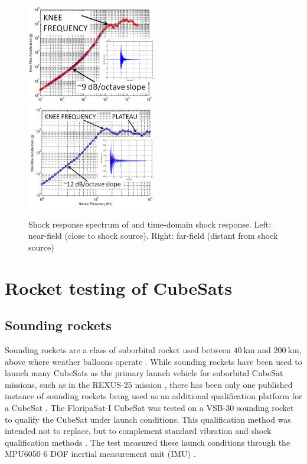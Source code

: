\documentclass{report}
\begin{document}
\begin{figure}[H]
  \includegraphics[width=0.5\textwidth]{images/pyroshock2.png}
  \includegraphics[width=0.5\textwidth]{images/pyroshock1.png}
  \caption{Shock response spectrum of and time-domain shock response. Left: near-field (close to shock source). Right: far-field (distant from shock source) \cite{nasa-pyroshock}}
  \label{fig:pyroshock}
\end{figure}


\section{Rocket testing of CubeSats}
\subsection{Sounding rockets}
Sounding rockets are a class of suborbital rocket used between $\SI{40}{\kilo\metre}$ and $\SI{200}{\kilo\metre}$, above where weather balloons operate \cite{seibert2006history}. While sounding rockets have been used to launch many CubeSats as the primary launch vehicle for suborbital CubeSat missions, such as in the REXUS-25 mission \cite{pont2019rexus}, there has been only one published instance of sounding rockets being used as an additional qualification platform for a CubeSat \cite{slongo2019pre}. The FloripaSat-I CubeSat was tested on a VSB-30 sounding rocket \cite{slongo2019pre} to qualify the CubeSat under launch conditions. This qualification method was intended not to replace, but to complement standard vibration and shock qualification methods \cite{slongo2019pre}. The test measured these launch conditions through the MPU6050 6 DOF inertial measurement unit (IMU) \cite{slongo2019pre}.
\end{document}
